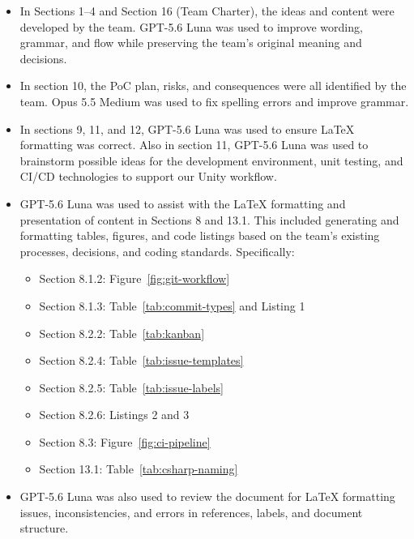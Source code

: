 \documentclass{article}
\begin{document}
\begin{itemize}
    \item In Sections 1--4 and Section 16 (Team Charter), the ideas and content
    were developed by the team. GPT-5.6 Luna was used to improve wording,
    grammar, and flow while preserving the team's original meaning and decisions.

    \item In section 10, the PoC plan, risks, and consequences were all identified by the team.
    Opus 5.5 Medium was used to fix spelling errors and improve grammar.

    \item In sections 9, 11, and 12, GPT-5.6 Luna was used to ensure \LaTeX{} formatting was correct. Also in section 11,
    GPT-5.6 Luna was used to brainstorm possible ideas for the development environment, unit testing, and CI/CD technologies to support
    our Unity workflow.
  
    \item GPT-5.6 Luna was used to assist with the LaTeX formatting and
    presentation of content in Sections 8 and 13.1. This included generating
    and formatting tables, figures, and code listings based on the team's
    existing processes, decisions, and coding standards. Specifically:

    \begin{itemize}
        \item Section 8.1.2: Figure~\ref{fig:git-workflow}
        \item Section 8.1.3: Table~\ref{tab:commit-types} and Listing 1
        \item Section 8.2.2: Table~\ref{tab:kanban}
        \item Section 8.2.4: Table~\ref{tab:issue-templates}
        \item Section 8.2.5: Table~\ref{tab:issue-labels}
        \item Section 8.2.6: Listings 2 and 3
        \item Section 8.3: Figure~\ref{fig:ci-pipeline}
        \item Section 13.1: Table~\ref{tab:csharp-naming}
    \end{itemize}

    \item GPT-5.6 Luna was also used to review the document for
    LaTeX formatting issues, inconsistencies, and errors in references,
    labels, and document structure.
\end{itemize}
\end{document}
